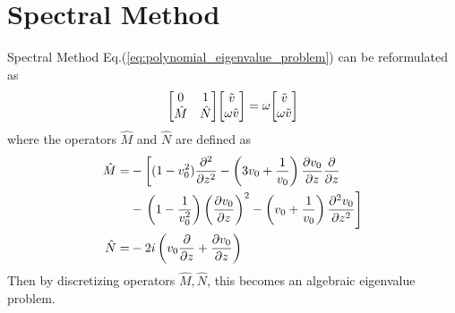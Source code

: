 \section{Spectral Method}
\begin{frame}{Spectral Method}
  Eq.(\ref{eq:polynomial_eigenvalue_problem}) can be reformulated as 
  \begin{equation} \label{eq:eigenvalue-problem}
	\mqty[ 0 & 1\\ \hat{M} & \hat{N} ]\mqty[ \tilde{v}\\ \omega \tilde{v}] = \omega\mqty[ \tilde{v}\\ \omega \tilde{v}]
\end{equation}
where the operators $\hat{M}$ and $\hat{N}$ are defined as
\begin{align*}
	\hat{M} = &-\left[(1-v_0^2)\pdv[2]{}{z} 
	-\left(3v_0 + \frac{1}{v_0}\right)\pdv{v_0}{z}\pdv{}{z}\right. \\ 
  &- \left.  \left(1-\frac{1}{v_0^2}\right)\left(\pdv{v_0}{z}\right)^2 
	- \left(v_0+\frac{1}{v_0}\right)\pdv[2]{v_0}{z}\right] \\
	\hat{N} = &-2i\left(v_0\pdv{}{z} +\pdv{v_0}{z} \right) 
\end{align*}
  Then by discretizing operators $\hat{M},\hat{N}$, this becomes an algebraic eigenvalue problem.
\end{frame}

